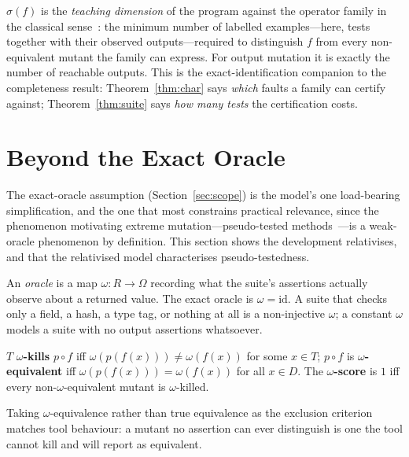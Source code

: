 \documentclass[runningheads,envcountsect,envcountsame]{llncs}
\begin{document}
\begin{remark}
\label{rem:teaching}
$\sigma(f)$ is the \emph{teaching dimension} of the program against the operator
family in the classical sense~\cite{goldman1995}: the minimum number of labelled
examples---here, tests together with their observed outputs---required to
distinguish $f$ from every non-equivalent mutant the family can express. For
output mutation it is exactly the number of reachable outputs. This is the
exact-identification companion to the completeness result:
Theorem~\ref{thm:char} says \emph{which} faults a family can certify against;
Theorem~\ref{thm:suite} says \emph{how many tests} the certification costs.
\end{remark}

\section{Beyond the Exact Oracle}
\label{sec:oracle}

The exact-oracle assumption (Section~\ref{sec:scope}) is the model's one
load-bearing simplification, and the one that most constrains practical
relevance, since the phenomenon motivating extreme mutation---pseudo-tested
methods~\cite{niedermayr2016,veraperez2018}---is a weak-oracle phenomenon by
definition. This section shows the development relativises, and that the
relativised model characterises pseudo-testedness.

\begin{definition}[oracle]
\label{def:oracle}
An \emph{oracle} is a map $\omega : R \to \Omega$ recording what the suite's
assertions actually observe about a returned value. The exact oracle is
$\omega = \mathrm{id}$. A suite that checks only a field, a hash, a type tag, or
nothing at all is a non-injective $\omega$; a constant $\omega$ models a suite
with no output assertions whatsoever.
\end{definition}

\begin{definition}
\label{def:okill}
$T$ \textbf{$\omega$-kills} $p \circ f$ iff $\omega(p(f(x))) \neq \omega(f(x))$
for some $x \in T$; $p \circ f$ is \textbf{$\omega$-equivalent} iff
$\omega(p(f(x))) = \omega(f(x))$ for all $x \in D$. The \textbf{$\omega$-score}
is $1$ iff every non-$\omega$-equivalent mutant is $\omega$-killed.
\end{definition}

Taking $\omega$-equivalence rather than true equivalence as the exclusion
criterion matches tool behaviour: a mutant no assertion can ever distinguish is
one the tool cannot kill and will report as equivalent.
\end{document}
